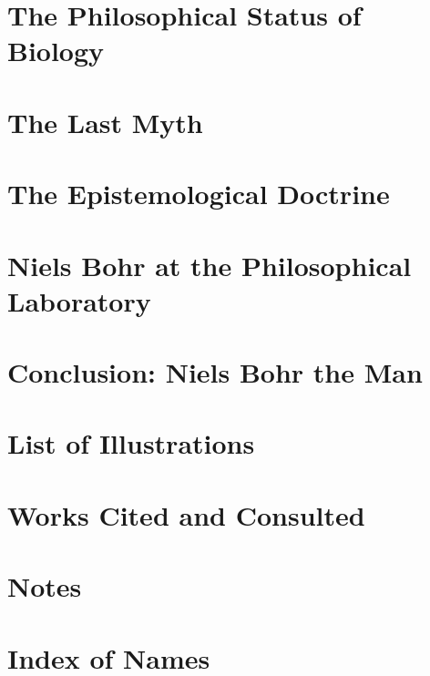 \documentclass[12pt,a4paper]{book}
\begin{document}
\chapter{The Philosophical Status of Biology}
\label{chap:biology}

\chapter{The Last Myth}
\label{chap:last-myth}

\chapter{The Epistemological Doctrine}
\label{chap:epistemology}

\chapter{Niels Bohr at the Philosophical Laboratory}
\label{chap:phil-laboratory}

\chapter*{Conclusion: Niels Bohr the Man}
\label{chap:conclusion}

\backmatter
\chapter{List of Illustrations}
\label{back:illustrations}

\chapter{Works Cited and Consulted}
\label{back:bibliography}

\chapter{Notes}
\label{back:notes}

\chapter{Index of Names}
\label{back:index}
\end{document}
